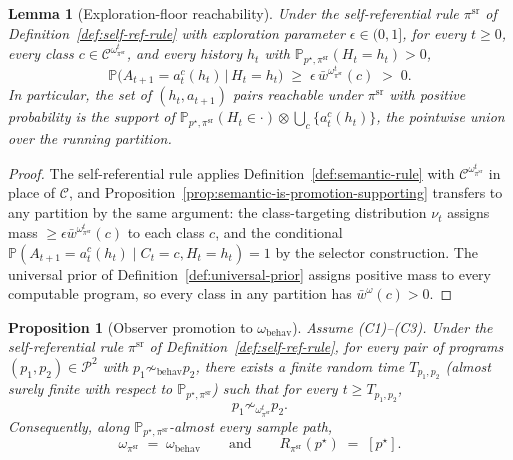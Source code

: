 \documentclass[11pt]{article}
\newtheorem{proposition}[theorem]{Proposition}
\newtheorem{lemma}[theorem]{Lemma}
\theoremstyle{definition}
\theoremstyle{remark}
\newcommand{\Ccal}{\mathcal{C}}
\newcommand{\Pcal}{\mathcal{P}}
\newcommand{\Prob}{\mathbb{P}}
\begin{document}
\begin{lemma}[Exploration-floor reachability]
\label{lem:exploration-reachability}
Under the self-referential rule $\pi^{\mathrm{sr}}$ of Definition~\ref{def:self-ref-rule} with exploration parameter $\epsilon\in(0,1]$, for every $t\ge 0$, every class $c\in\Ccal^{\omega_{\pi^{\mathrm{sr}}}^t}$, and every history $h_t$ with $\Prob_{p^\star,\pi^{\mathrm{sr}}}(H_t=h_t)>0$,
\[
\Prob\bigl(A_{t+1}=a_t^c(h_t)\,\big|\,H_t=h_t\bigr)\;\ge\;\epsilon\,\bar w^{\omega_{\pi^{\mathrm{sr}}}^t}(c)\;>\;0.
\]
In particular, the set of $(h_t,a_{t+1})$ pairs reachable under $\pi^{\mathrm{sr}}$ with positive probability is the support of $\Prob_{p^\star,\pi^{\mathrm{sr}}}(H_t\in\cdot)\otimes\bigcup_c\{a_t^c(h_t)\}$, the pointwise union over the running partition.
\end{lemma}

\begin{proof}
The self-referential rule applies Definition~\ref{def:semantic-rule} with $\Ccal^{\omega_{\pi^{\mathrm{sr}}}^t}$ in place of $\Ccal$, and Proposition~\ref{prop:semantic-is-promotion-supporting} transfers to any partition by the same argument: the class-targeting distribution $\nu_t$ assigns mass $\ge\epsilon\bar w^{\omega_{\pi^{\mathrm{sr}}}^t}(c)$ to each class $c$, and the conditional $\Prob(A_{t+1}=a_t^c(h_t)\mid C_t=c,H_t=h_t)=1$ by the selector construction. The universal prior of Definition~\ref{def:universal-prior} assigns positive mass to every computable program, so every class in any partition has $\bar w^\omega(c)>0$.
\end{proof}

\begin{proposition}[Observer promotion to $\omega_{\mathrm{behav}}$]
\label{prop:observer-promotion-sr}
Assume \textup{(C1)--(C3)}. Under the self-referential rule $\pi^{\mathrm{sr}}$ of Definition~\ref{def:self-ref-rule}, for every pair of programs $(p_1,p_2)\in\Pcal^2$ with $p_1\not\sim_{\mathrm{behav}}p_2$, there exists a finite random time $T_{p_1,p_2}$ (almost surely finite with respect to $\Prob_{p^\star,\pi^{\mathrm{sr}}}$) such that for every $t\ge T_{p_1,p_2}$,
\[
p_1\not\sim_{\omega_{\pi^{\mathrm{sr}}}^t}p_2.
\]
Consequently, along $\Prob_{p^\star,\pi^{\mathrm{sr}}}$-almost every sample path,
\[
\omega_{\pi^{\mathrm{sr}}}\;=\;\omega_{\mathrm{behav}}
\qquad\text{and}\qquad
R_{\pi^{\mathrm{sr}}}(p^\star)\;=\;[p^\star].
\]
\end{proposition}
\end{document}
